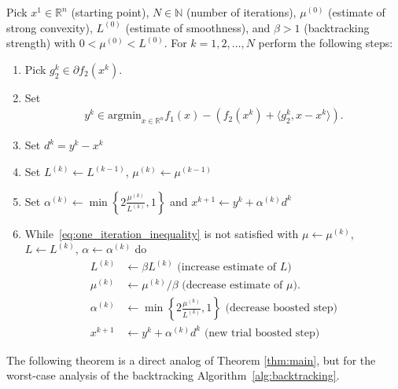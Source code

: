 \documentclass{article} %
\begin{document}
{\begin{algorithm}[H]
\caption{Boosted DCA with backtracking\label{alg:backtracking}}
\begin{algorithmic}
\STATE Pick $x^1\in\mathbb{R}^n$ (starting point), $N \in \mathbb{N}$ (number of iterations), ${\mu}^{(0)}$ (estimate of strong convexity), ${L}^{(0)}$ (estimate of smoothness), and $\beta>1$ (backtracking strength) with $0<{\mu}^{(0)}<{L}^{(0)}$.
\STATE For $k=1, 2, \ldots, N$ perform the following steps:\\
\begin{enumerate}
\item Pick   $g_2^{k}\in\partial f_2(x^{k})$.
\item
Set
\begin{align*}
  y^{k}\in \text{argmin}_{x\in\mathbb{R}^n} f_1(x)-\left(f_2(x^k)+\langle g_2^k, x-x^k\rangle\right).
\end{align*}
\item
Set $d^k = y^k - x^k$
\item Set $L^{(k)}\leftarrow L^{(k-1)}$, $\mu^{(k)}\leftarrow \mu^{(k-1)}$ 
\item Set $\alpha^{(k)} \leftarrow \min\left\{2\tfrac{{\mu^{(k)}}}{{L^{(k)}}},1\right\}$ and $x^{k+1} \leftarrow y^k + \alpha^{(k)} d^k$
\item While~\eqref{eq:one_iteration_inequality} is not satisfied with $\mu\leftarrow {\mu}^{(k)}$, $L\leftarrow L^{(k)}$, $\alpha\leftarrow \alpha^{(k)}$ do
\begin{align*}
  L^{(k)}&\leftarrow \beta L^{(k)} \text{ (increase estimate of $L$) }\\
  \mu^{(k)}&\leftarrow \mu^{(k)}/\beta \text{ (decrease estimate of $\mu$). }\\
  \alpha^{(k)} &\leftarrow \min\left\{2\tfrac{{\mu^{(k)}}}{{L^{(k)}}},1\right\} \text{ (decrease boosted step)}\\
  x^{k+1} &\leftarrow y^k + \alpha^{(k)} d^k \text{ (new trial boosted step)}
\end{align*}
\end{enumerate}
\end{algorithmic}
\end{algorithm}
The following theorem is a direct analog of Theorem \ref{thm:main}, but for the worst-case analysis of the backtracking  Algorithm~\ref{alg:backtracking}.

}
\end{document}
